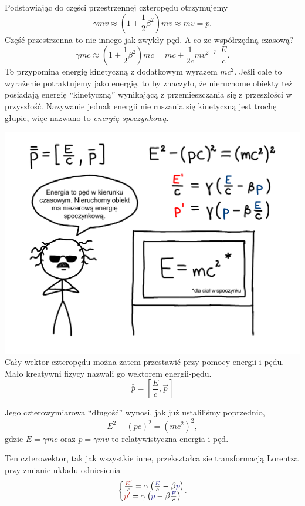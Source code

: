 \documentclass[10pt,twocolumn,fleqn,polish]{article}
\makeatletter
\providecommand{\mathcolor}[2]{{\color{#1}#2}}
\newcommand{\mred}[1]{\mathcolor{BrickRed}{#1}}
\newcommand{\mblue}[1]{\mathcolor{Blue}{#1}}
\newcommand{\fourvec}[1]{\bar{\bar{#1}}}
\newenvironment{eqsystem}
  {\left\lbrace
    \begin{array}{@{}l@{}}}
  {\end{array}\right.}
\makeatother
\begin{document}
Podstawiając do części przestrzennej czteropędu otrzymujemy
\[
  \gamma mv \approx (1 + \frac{1}{2}\beta^2)mv \approx mv = p.
\]
Część przestrzenna to nic innego jak zwykły pęd.
A co ze współrzędną czasową?
\[
  \gamma mc \approx (1 + \frac{1}{2}\beta^2)mc = mc + \frac{1}{2c}mv^2 \stackrel?= \frac{E}{c}.
\]
To przypomina energię kinetyczną z dodatkowym wyrazem $mc^2$.
Jeśli całe to wyrażenie potraktujemy jako energię, to by znaczyło, że
nieruchome obiekty też posiadają energię ``kinetyczną'' wynikającą z przemieszczania
się z przeszłości w przyszłość. Nazywanie jednak energii nie ruszania się kinetyczną
jest trochę głupie, więc nazwano to \textit{energią spoczynkową}.

\newpage

\noindent\includegraphics[width=1\linewidth]{pages/STA-page38}
Cały wektor czteropędu można zatem przestawić przy pomocy energii i pędu.
Mało kreatywni fizycy nazwali go wektorem energii-pędu.
\[\fourvec p = \left[\frac{E}{c}, \vec p\right]\]

Jego czterowymiarowa ``długość'' wynosi, jak już ustaliliśmy poprzednio,
\[ E^2 - (pc)^2 = (mc^2)^2, \]
gdzie $E = \gamma mc$ oraz $p = \gamma mv$ to relatywistyczna energia i pęd.

Ten czterowektor, tak jak wszystkie inne, przekształca sie transformacją Lorentza
przy zmianie układu odniesienia
\[
  \begin{eqsystem}
    \frac{\mred{E'}}{c} = \gamma \left(\frac{\mblue{E}}{c} - \beta \mblue{p}\right) \\
    \mred{p'} = \gamma \left(\mblue{p} - \beta \frac{\mblue E}{c}\right)
  \end{eqsystem}.
\]
\end{document}
